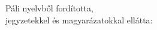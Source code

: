 
\vspace*{5em}

{\centering

{\Large\chapTitleFont\scshape\thetitle}
\medskip

{\itshape\thesubtitle}
\vspace*{2\baselineskip}

Páli nyelvből fordította,\\
jegyzetekkel és magyarázatokkal ellátta:
\bigskip

\theauthor

}

